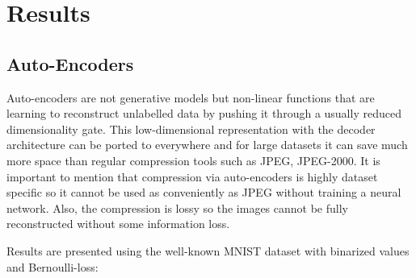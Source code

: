 \documentclass[12pt, english]{article}
\begin{document}
\newpage

\section{Results}

\vspace{7mm}

\subsection{Auto-Encoders}

\vspace{5mm}

\par Auto-encoders are not generative models but non-linear functions that are learning to reconstruct unlabelled data by pushing it through a usually reduced dimensionality gate. This low-dimensional representation with the decoder architecture can be ported to everywhere and for large datasets it can save much more space than regular compression tools such as JPEG, JPEG-2000. It is important to mention that compression via auto-encoders is highly dataset specific so it cannot be used as conveniently as JPEG without training a neural network. Also, the compression is lossy so the images cannot be fully reconstructed without some information loss.

\vspace{4mm}

\par Results are presented using the well-known MNIST dataset with binarized values and Bernoulli-loss:

\vspace{4mm}
\end{document}
